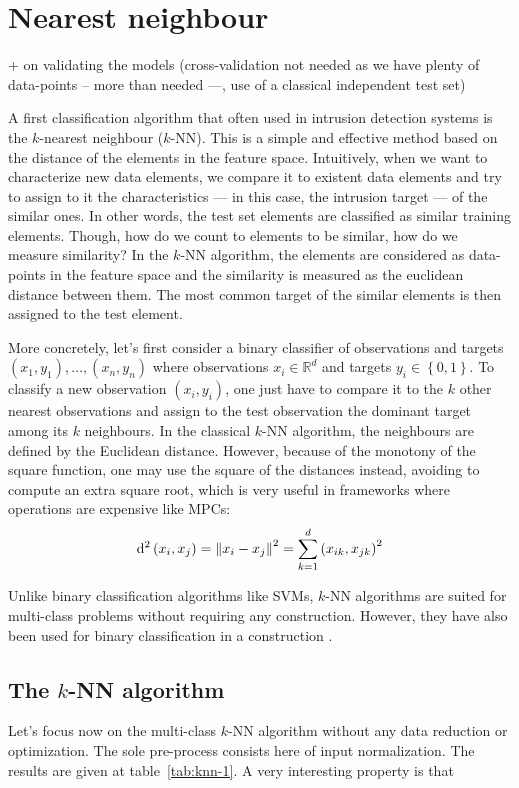 \section{Nearest neighbour}
+ on validating the models (cross-validation not needed as we have plenty of data-points -- more than needed ---, use of a classical independent test set)

A first classification algorithm that often used in intrusion detection systems is the $k$-nearest neighbour ($k$-NN). This is a simple and effective method based on the distance of the elements in the feature space. Intuitively, when we want to characterize new data elements, we compare it to existent data elements and try to assign to it the characteristics --- in this case, the intrusion target --- of the similar ones. In other words, the test set elements are classified as similar training elements. Though, how do we count to elements to be similar, how do we measure similarity? In the $k$-NN algorithm, the elements are considered as data-points in the feature space and the similarity is measured as the euclidean distance between them. The most common target of the similar elements is then assigned to the test element.

More concretely, let's first consider a binary classifier of observations and targets $\left( x_1, y_1 \right), \ldots , \left( x_n, y_n \right)$ where observations $x_i \in \mathbb{R}^d$ and targets $y_i \in \left\{0,1\right\}$. To classify a new observation $\left( x_i, y_i \right)$, one just have to compare it to the $k$ other nearest observations and assign to the test observation the dominant target among its $k$ neighbours. In the classical $k$-NN algorithm, the neighbours are defined by the Euclidean distance. However, because of the monotony of the square function, one may use the square of the distances instead, avoiding to compute an extra square root, which is very useful in frameworks where operations are expensive like MPCs:
\begin{equation}
    \mathrm{d}^2\left( x_i, x_j \right) = \left\lVert x_i-x_j\right\rVert^2 = \sum_{k=1}^d \left( x_{ik}, x_{jk} \right)^2
\end{equation}

Unlike binary classification algorithms like SVMs, $k$-NN algorithms are suited for multi-class problems without requiring any construction. However, they have also been used for binary classification in a construction \cite{Aburomman2016ASystem}. 

\subsection{The $k$-NN algorithm}
Let's focus now on the multi-class $k$-NN algorithm without any data reduction or optimization. The sole pre-process consists here of input normalization. The results are given at table~\ref{tab:knn-1}. A very interesting property is that 


